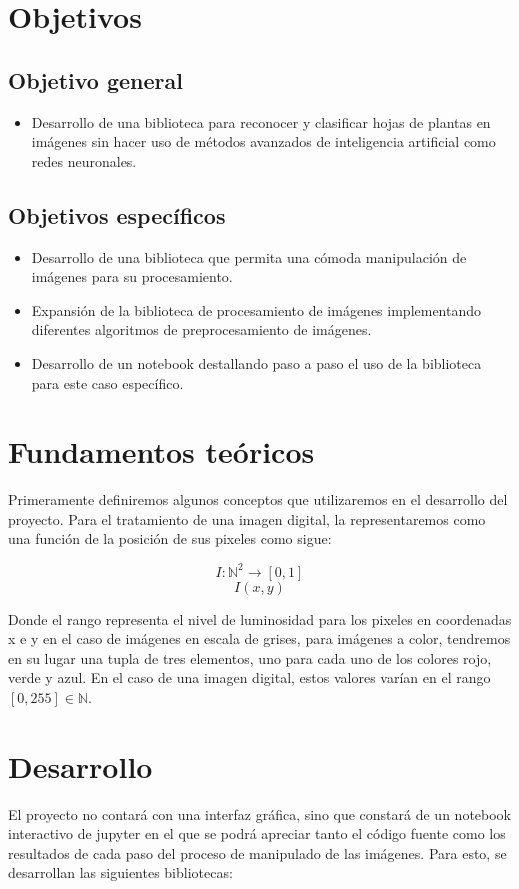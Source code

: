 \documentclass[letter]{article}
\begin{document}
\section{Objetivos}
\label{sec:orgc99e6ae}
\subsection{Objetivo general}
\label{sec:orgf501058}
\begin{itemize}
\item Desarrollo de una biblioteca para reconocer y clasificar hojas de plantas en
imágenes sin hacer uso de métodos avanzados de inteligencia artificial como
redes neuronales.
\end{itemize}

\subsection{Objetivos específicos}
\label{sec:orgc4911ca}
\begin{itemize}
\item Desarrollo de una biblioteca que permita una cómoda manipulación de imágenes
para su procesamiento.
\item Expansión de la biblioteca de procesamiento de imágenes implementando
diferentes algoritmos de preprocesamiento de imágenes.
\item Desarrollo de un notebook destallando paso a paso el uso de la biblioteca para
este caso específico.
\end{itemize}

\section{Fundamentos teóricos}
\label{sec:orge0a9b78}
Primeramente definiremos algunos conceptos que utilizaremos en el desarrollo del
proyecto. Para el tratamiento de una imagen digital, la representaremos como una
función de la posición de sus pixeles como sigue:

$$ I:\mathbb N^2 \rightarrow [0, 1] $$
$$ I(x, y) $$

Donde el rango representa el nivel de luminosidad para los pixeles en
coordenadas x e y en el caso de imágenes en escala de grises, para imágenes a
color, tendremos en su lugar una tupla de tres elementos, uno para cada uno de
los colores rojo, verde y azul. En el caso de una imagen digital, estos valores
varían en el rango \([0,255]\in \mathbb N\).

\section{Desarrollo}
\label{sec:orge37e224}
El proyecto no contará con una interfaz gráfica, sino que constará de un
notebook interactivo de jupyter en el que se podrá apreciar tanto el código
fuente como los resultados de cada paso del proceso de manipulado de las
imágenes. Para esto, se desarrollan las siguientes bibliotecas:
\end{document}
